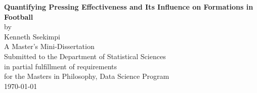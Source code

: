 \begin{titlepage}
\begin{center}
  \vspace*{2cm}
  
  {\Huge \textbf{Quantifying Pressing Effectiveness and Its Influence on Formations in Football}} \\[1.5cm]
	
  by \\[0.5cm]
  {\Large Kenneth Ssekimpi} \\[2cm]
  
  {\Large A Master's Mini-Dissertation} \\[0.5cm]
  Submitted to the Department of Statistical Sciences \\[0.5cm]
  in partial fulfillment of requirements \\[0.5cm]
  for the Masters in Philosophy, Data Science Program \\[2cm]
  
  {\Large \today}
\end{center}
\end{titlepage}